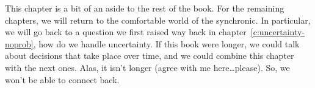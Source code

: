 This chapter is a bit of an aside to the rest of the book.  For the remaining chapters, we will return to the comfortable world of the synchronic.  In particular, we will go back to a question we first raised way back in chapter~\ref{c:uncertainty-noprob}, how do we handle uncertainty.  If this book were longer, we could talk about decisions that take place over time, and we could combine this chapter with the next ones.  Alas, it isn't longer (agree with me here\dots please).  So, we won't be able to connect back.